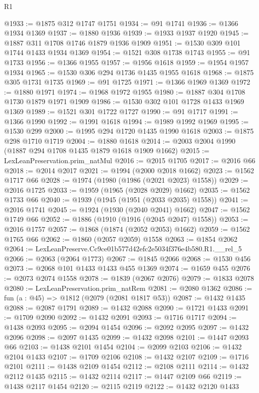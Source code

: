 \begin{lexlean}{R1}
\begin{coremodule}
@1933 := @1875 @312 @1747 @1751
@1934 := @91 @1741
@1936 := @1366 @1934 @1369
@1937 := @1880 @1936
@1939 := @1933 @1937 @1920
@1945 := @1887 @311 @1708 @1746 @1879 @1936 @1909
@1951 := @1530 @309 @101 @1744 @1433 @1934 @1369
@1954 := @1521 @308 @1738 @1743
@1955 := @91 @1733
@1956 := @1366 @1955
@1957 := @1956 @1618
@1959 := @1954 @1957 @1934
@1965 := @1530 @306 @294 @1736 @1435 @1955 @1618
@1968 := @1875 @305 @1731 @1735
@1969 := @91 @1725
@1971 := @1366 @1969 @1369
@1972 := @1880 @1971
@1974 := @1968 @1972 @1955
@1980 := @1887 @304 @1708 @1730 @1879 @1971 @1909
@1986 := @1530 @302 @101 @1728 @1433 @1969 @1369
@1989 := @1521 @301 @1722 @1727
@1990 := @91 @1717
@1991 := @1366 @1990
@1992 := @1991 @1618
@1994 := @1989 @1992 @1969
@1995 := @1530 @299
@2000 := @1995 @294 @1720 @1435 @1990 @1618
@2003 := @1875 @298 @1710 @1719
@2004 := @1880 @1618
@2014 := @2003 @2004 @1990 (@1887 @294 @1708 @1435 @1879 @1618 @1909 @1662)
@2015 := LexLeanPreservation.prim_natMul
@2016 := @2015 @1705
@2017 := @2016 @66
@2018 := @2014 @2017
@2021 := @1994 (@2000 @2018 @1662)
@2023 := @1562 @1717 @66
@2028 := @1974 (@1980 (@1986 (@2021 @2023) @1558))
@2029 := @2016 @1725
@2033 := @1959 (@1965 (@2028 @2029) @1662)
@2035 := @1562 @1733 @66
@2040 := @1939 (@1945 (@1951 (@2033 @2035) @1558))
@2041 := @2016 @1741
@2045 := @1924 (@1930 (@2040 @2041) @1662)
@2047 := @1562 @1749 @66
@2052 := @1886 (@1910 (@1916 (@2045 @2047) @1558))
@2053 := @2016 @1757
@2057 := @1868 (@1874 (@2052 @2053) @1662)
@2059 := @1562 @1765 @66
@2062 := @1860 (@2057 @2059) @1558
@2063 := @1854 @2062
@2064 := LexLeanPreserve.Cc9ce01b577d42efc2e5034f376e4b580.R1.__rel_5
@2066 := @2063 (@2064 @1773)
@2067 := @1845 @2066
@2068 := @1530 @456
@2073 := @2068 @101 @1433 @1433 @455 @1369
@2074 := @1659 @455
@2076 := @2073 @2074 @1558
@2078 := @1839 (@2067 @2076)
@2079 := @1833 @2078
@2080 := LexLeanPreservation.prim_natRem
@2081 := @2080 @1362
@2086 := fun (a : @45) => @1812 (@2079 (@2081 @1817 @53))
@2087 := @1432 @1435
@2088 := @2087 @1791
@2089 := @1432 @2088
@2090 := @1721 @1433
@2091 := @1709 @2090
@2092 := @1432 @2091
@2093 := @1716 @1717
@2094 := @1438 @2093
@2095 := @2094 @1454
@2096 := @2092 @2095
@2097 := @1432 @2096
@2098 := @2097 @1435
@2099 := @1432 @2098
@2101 := @1447 @2093 @66
@2103 := @1438 @2101 @1454
@2104 := @2099 @2103
@2106 := @1432 @2104 @1433
@2107 := @1709 @2106
@2108 := @1432 @2107
@2109 := @1716 @2101
@2111 := @1438 @2109 @1454
@2112 := @2108 @2111
@2114 := @1432 @2112 @1435
@2115 := @1432 @2114
@2117 := @1447 @2109 @66
@2119 := @1438 @2117 @1454
@2120 := @2115 @2119
@2122 := @1432 @2120 @1433

\end{coremodule}
\end{lexlean}
